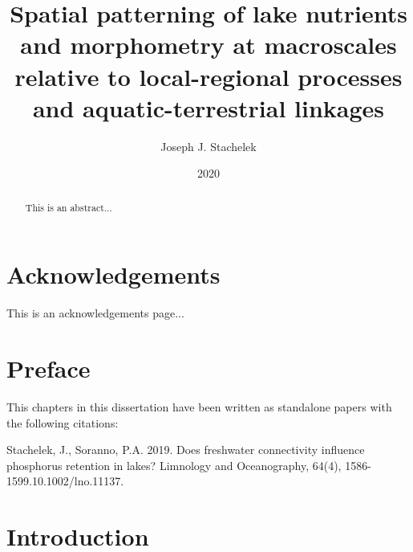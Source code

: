 \documentclass[]{msu-thesis}
\title{Spatial patterning of lake nutrients and morphometry at macroscales relative to local-regional processes and aquatic-terrestrial linkages}
\author{Joseph J. Stachelek}
\date{2020}
\theoremstyle{definition}
\theoremstyle{definition}
\theoremstyle{definition}
\theoremstyle{remark}
\begin{document}

\maketitlepage
\begin{abstract}
This is an abstract...
\end{abstract}

\clearpage

\makecopyrightpage

%
\makededicationpage
%
\clearpage

\chapter*{Acknowledgements}
\DoubleSpacing %
This is an acknowledgements page...
\clearpage

\chapter*{Preface}
\DoubleSpacing
This chapters in this dissertation have been written as standalone papers with the following citations:\\

\begin{hangparas}{.25in}{1}
Stachelek, J., Soranno, P.A. 2019. Does freshwater connectivity influence phosphorus retention in lakes? Limnology and Oceanography, 64(4), 1586-1599.10.1002/lno.11137.
\end{hangparas}

\clearpage

\SingleSpacing
\tableofcontents* %
\clearpage
\listoftables %
\clearpage
\listoffigures %
\mainmatter
%

\chapter{Introduction}\label{intro}

\DoubleSpacing
\end{document}
